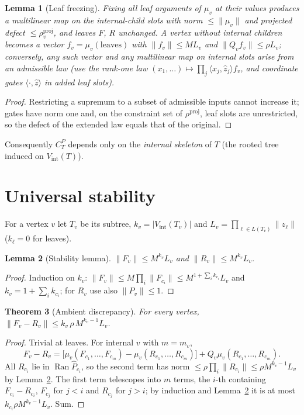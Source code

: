 \documentclass[11pt]{amsart}
\newtheorem{theorem}{Theorem}[section]
\newtheorem{lemma}[theorem]{Lemma}
\theoremstyle{definition}
\newcommand{\Ran}{\operatorname{Ran}}
\newcommand{\Vint}{V_{\mathrm{int}}}
\newcommand{\proj}{\mathrm{proj}}
\newcommand{\norm}[1]{\lVert #1\rVert}
\newcommand{\ip}[2]{\langle #1,#2\rangle}
\begin{document}
\begin{lemma}[Leaf freezing]\label{lem:freezing}
Fixing all leaf arguments of $\mu_v$ at their values produces a multilinear map on
the internal-child slots with norm $\le\norm{\mu_v}$ and projected defect
$\le\rho^\proj_v$, and leaves $F$, $R$ unchanged. A vertex without internal children
becomes a vector $f_v=\mu_v(\text{leaves})$ with $\norm{f_v}\le M L_v$ and
$\norm{Q_vf_v}\le\rho L_v$; conversely, any such vector and any multilinear map on
internal slots arise from an admissible law (use the rank-one law
$(x_1,\dots)\mapsto\prod_j\ip{x_j}{\hat z_j}f_v$, and coordinate gates
$\ip{\cdot}{\hat z}$ in added leaf slots).
\end{lemma}
\begin{proof}
Restricting a supremum to a subset of admissible inputs cannot increase it; gates
have norm one and, on the constraint set of $\rho^\proj$, leaf slots are
unrestricted, so the defect of the extended law equals that of the original.
\end{proof}

Consequently $C^P_T$ depends only on the \emph{internal skeleton} of $T$ (the
rooted tree induced on $\Vint(T)$).

\section{Universal stability}

For a vertex $v$ let $T_v$ be its subtree, $k_v=\lvert\Vint(T_v)\rvert$ and
$L_v=\prod_{\ell\in L(T_v)}\norm{z_\ell}$ ($k_\ell=0$ for leaves).

\begin{lemma}[Stability lemma]\label{lem:stability}
$\norm{F_v}\le M^{k_v}L_v$ and $\norm{R_v}\le M^{k_v}L_v$.
\end{lemma}
\begin{proof}
Induction on $k_v$: $\norm{F_v}\le M\prod_i\norm{F_{c_i}}\le M^{1+\sum_ik_{c_i}}L_v$ and
$k_v=1+\sum_ik_{c_i}$; for $R_v$ use also $\norm{P_v}\le1$.
\end{proof}

\begin{theorem}[Ambient discrepancy]\label{thm:ambient}
For every vertex, $\norm{F_v-R_v}\le k_v\,\rho\,M^{k_v-1}L_v$.
\end{theorem}
\begin{proof}
Trivial at leaves. For internal $v$ with $m=m_v$,
\[
F_v-R_v=\bigl[\mu_v(F_{c_1},\dots,F_{c_m})-\mu_v(R_{c_1},\dots,R_{c_m})\bigr]+Q_v\mu_v(R_{c_1},\dots,R_{c_m}).
\]
All $R_{c_i}$ lie in $\Ran\widehat P_{c_i}$, so the second term has norm
$\le\rho\prod_i\norm{R_{c_i}}\le\rho M^{k_v-1}L_v$ by Lemma~\ref{lem:stability}. The
first term telescopes into $m$ terms, the $i$-th containing $F_{c_i}-R_{c_i}$,
$F_{c_j}$ for $j<i$ and $R_{c_j}$ for $j>i$; by induction and
Lemma~\ref{lem:stability} it is at most $k_{c_i}\rho M^{k_v-1}L_v$. Sum.
\end{proof}
\end{document}
